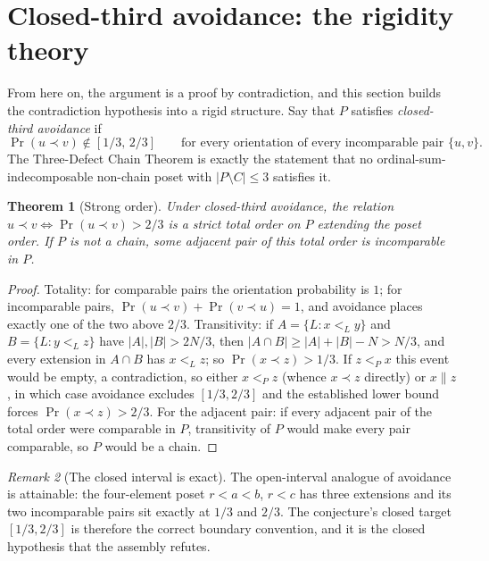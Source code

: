 \documentclass[11pt]{article}
\newtheorem{theorem}{Theorem}[section]
\theoremstyle{definition}
\theoremstyle{remark}
\newtheorem{remark}[theorem]{Remark}
\newcommand{\pr}{\operatorname{Pr}}
\begin{document}
\section{Closed-third avoidance: the rigidity theory}\label{sec:rigidity}
From here on, the argument is a proof by contradiction, and this section builds the
contradiction hypothesis into a rigid structure. Say that $P$ satisfies
\emph{closed-third avoidance} if
\[
\pr(u\prec v)\notin[1/3,\,2/3]\qquad\text{for every orientation of every incomparable
pair }\{u,v\}.
\]
The Three-Defect Chain Theorem is exactly the statement that no
ordinal-sum-indecomposable non-chain poset with $|P\setminus C|\le3$ satisfies it.

\begin{theorem}[Strong order]\label{thm:strongorder}
Under closed-third avoidance, the relation $u\prec v\iff\pr(u\prec v)>2/3$ is a strict
total order on $P$ extending the poset order. If $P$ is not a chain, some adjacent pair
of this total order is incomparable in $P$.
\end{theorem}

\begin{proof}
Totality: for comparable pairs the orientation probability is $1$; for incomparable
pairs, $\pr(u\prec v)+\pr(v\prec u)=1$, and avoidance places exactly one of the two above
$2/3$. Transitivity: if $A=\{L:x<_Ly\}$ and $B=\{L:y<_Lz\}$ have $|A|,|B|>2N/3$, then
$|A\cap B|\ge|A|+|B|-N>N/3$, and every extension in $A\cap B$ has $x<_Lz$; so
$\pr(x\prec z)>1/3$. If $z<_Px$ this event would be empty, a contradiction, so either
$x<_Pz$ (whence $x\prec z$ directly) or $x\parallel z$, in which case avoidance excludes
$[1/3,2/3]$ and the established lower bound forces $\pr(x\prec z)>2/3$. For the adjacent
pair: if every adjacent pair of the total order were comparable in $P$, transitivity of
$P$ would make every pair comparable, so $P$ would be a chain.
\end{proof}

\begin{remark}[The closed interval is exact]
The open-interval analogue of avoidance is attainable: the four-element poset
$r<a<b$, $r<c$ has three extensions and its two incomparable pairs sit exactly at
$1/3$ and $2/3$. The conjecture's closed target $[1/3,2/3]$ is therefore the correct
boundary convention, and it is the closed hypothesis that the assembly refutes.
\end{remark}
\end{document}
